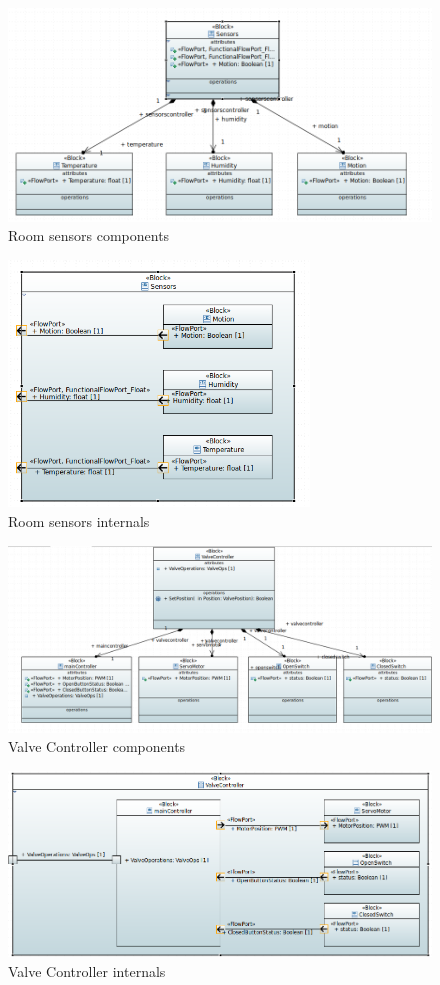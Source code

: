 \begin{figure}[H]
	\centering
	\includegraphics[width=13cm,keepaspectratio]{img/sysml/SensorsComponents}
	\caption{Room sensors components}
	\label{fig:room_sensors_components}
\end{figure}

\begin{figure}[H]
	\centering
	\includegraphics[width=8cm,keepaspectratio]{img/sysml/SensorsInternals}
	\caption{Room sensors internals}
	\label{fig:room_sensors_internals}
\end{figure}

\begin{figure}[H]
	\centering
	\includegraphics[width=12cm,keepaspectratio]{img/sysml/ValveControllerComponents}
	\caption{Valve Controller components}
	\label{fig:valve_dbd}
\end{figure}

\begin{figure}[H]
	\centering
	\includegraphics[width=12cm,keepaspectratio]{img/sysml/ValveControllerInternals}
	\caption{Valve Controller internals}
	\label{fig:valve_internals}
\end{figure}
